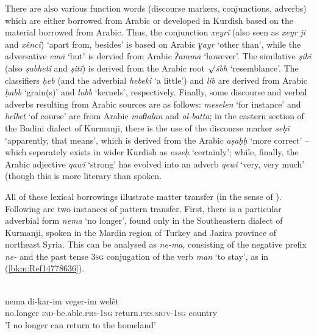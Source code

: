 \documentclass[output=paper]{langsci/langscibook}
\begin{document}
There are also various function words (discourse markers, conjunctions, adverbs) which are either borrowed from Arabic or developed in Kurdish based on the material borrowed from Arabic. Thus, the conjunction \textit{xeyrî} (also seen as \textit{xeyr} \textit{ji} and \textit{xêncî}) ‘apart from, besides’ is based on Arabic \textit{ɣayr} ‘other than’, while the adversative \textit{emā} ‘but’ is dervied from Arabic \textit{ʔammā} ‘however’. The similative \textit{şibî} (also \textit{şubhetî} and \textit{şitî}) is derived from the Arabic root ${\surd}$\textit{šbh} ‘resemblance’. The classifiers \textit{ḥeb} (and the adverbial \textit{hebekî} ‘a little’) and \textit{lib} are derived from Arabic \textit{ḥabb} ‘grain(s)’ and \textit{lubb} ‘kernels’, respectively. Finally, some discourse and verbal adverbs resulting from Arabic sources are as follows: \textit{meselen} ‘for instance’ and \textit{helbet} ‘of course’ are from Arabic \textit{maθalan} and \textit{al-batta}; in the eastern section of the Badini dialect of Kurmanji, there is the use of the discourse marker \textit{seḥî} ‘apparently, that means’, which is derived from the Arabic \textit{aṣaḥḥ} ‘more correct’ – which separately exists in wider Kurdish as \textit{esseḥ} ‘certainly’; while, finally, the Arabic adjective \textit{qawī} ‘strong’ has evolved into an adverb \textit{qewî} ‘very, very much’ (though this is more literary than spoken.      

All of these lexical borrowings illustrate matter transfer (in the sense of \citealt{MatrasSakel2007}). Following are two instances of pattern transfer. First, there is a particular adverbial form \textit{nema} ‘no longer’, found only in the Southeastern dialect of Kurmanji, spoken in the Mardin region of Turkey and Jazira province of northeast Syria. This can be analysed as \textit{ne-ma}, consisting of the negative prefix \textit{ne-} and the past tense 3\textsc{sg} conjugation of the verb \textit{man} ‘to stay’, as in (\ref{bkm:Ref14778636}).

\ea
{} \\
\gll nema di-kar-im veger-im welêt\\
     no.longer \textsc{ind}{}-be.able.\textsc{prs-1sg} return.\textsc{prs.sbjv-1sg} country\\
\glt {}'I no longer can return to the homeland'\z
\end{document}
